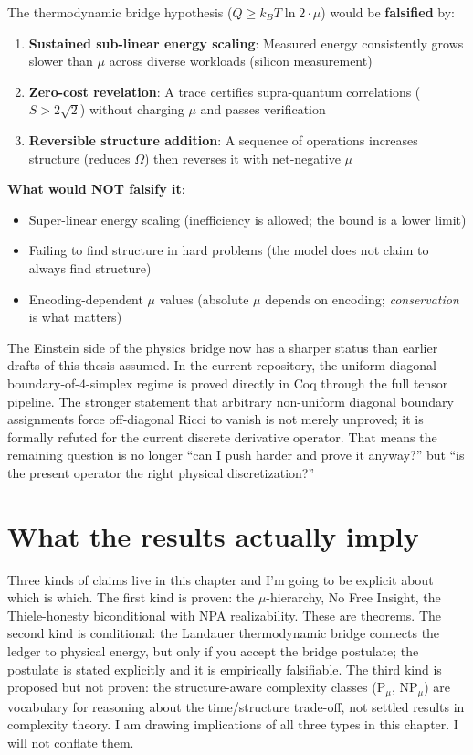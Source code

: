\begin{tcolorbox}[thesisbox,colback=yellow!10!white,colframe=orange!75!black,title=Falsifiability Criteria]
The thermodynamic bridge hypothesis ($Q \ge k_B T \ln 2 \cdot \mu$) would be \textbf{falsified} by:
\begin{enumerate}
    \item \textbf{Sustained sub-linear energy scaling}: Measured energy consistently grows slower than $\mu$ across diverse workloads (silicon measurement)
    \item \textbf{Zero-cost revelation}: A trace certifies supra-quantum correlations ($S > 2\sqrt{2}$) without charging $\mu$ and passes verification
    \item \textbf{Reversible structure addition}: A sequence of operations increases structure (reduces $\Omega$) then reverses it with net-negative $\mu$
\end{enumerate}

\textbf{What would NOT falsify it}:
\begin{itemize}
    \item Super-linear energy scaling (inefficiency is allowed; the bound is a lower limit)
    \item Failing to find structure in hard problems (the model does not claim to always find structure)
    \item Encoding-dependent $\mu$ values (absolute $\mu$ depends on encoding; \emph{conservation} is what matters)
\end{itemize}
\end{tcolorbox}

The Einstein side of the physics bridge now has a sharper status than earlier drafts of this thesis assumed. In the current repository, the uniform diagonal boundary-of-4-simplex regime is proved directly in Coq through the full tensor pipeline. The stronger statement that arbitrary non-uniform diagonal boundary assignments force off-diagonal Ricci to vanish is not merely unproved; it is formally refuted for the current discrete derivative operator. That means the remaining question is no longer ``can I push harder and prove it anyway?'' but ``is the present operator the right physical discretization?''


\section{What the results actually imply}

Three kinds of claims live in this chapter and I'm going to be explicit about which is which. The first kind is proven: the $\mu$-hierarchy, No Free Insight, the Thiele-honesty biconditional with NPA realizability. These are theorems. The second kind is conditional: the Landauer thermodynamic bridge connects the ledger to physical energy, but only if you accept the bridge postulate; the postulate is stated explicitly and it is empirically falsifiable. The third kind is proposed but not proven: the structure-aware complexity classes ($\text{P}_\mu$, $\text{NP}_\mu$) are vocabulary for reasoning about the time/structure trade-off, not settled results in complexity theory. I am drawing implications of all three types in this chapter. I will not conflate them.

